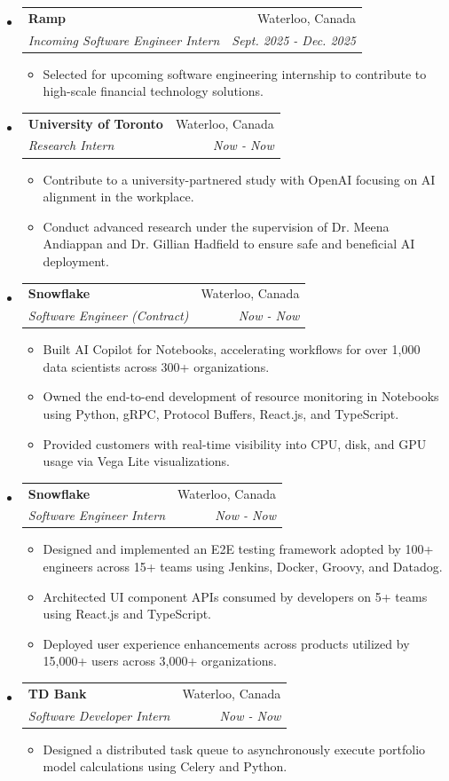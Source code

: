 \documentclass[letterpaper,11pt]{article}
\makeatletter
\newcommand{\resitem}[1]{\item #1 \vspace{-2pt}}
\newcommand{\ressubheading}[4]{
    \begin{tabular*}{6.5in}{p{4.8in}@{\extracolsep{\fill}}r}
            \textbf{#1} & #2 \\
            \textit{#3} & \textit{#4} \\
    \end{tabular*}\vspace{-8pt}}
\makeatother
\begin{document}
      \begin{itemize}
        \item \ressubheading{Ramp}{Waterloo, Canada}{Incoming Software Engineer Intern}{Sept. 2025 - Dec. 2025}
        \begin{itemize}
            \resitem{Selected for upcoming software engineering internship to contribute to high-scale financial technology solutions.}
        \end{itemize}
        \item \ressubheading{University of Toronto}{Waterloo, Canada}{Research Intern}{Now - Now}
        \begin{itemize}
            \resitem{Contribute to a university-partnered study with OpenAI focusing on AI alignment in the workplace.}
            \resitem{Conduct advanced research under the supervision of Dr. Meena Andiappan and Dr. Gillian Hadfield to ensure safe and beneficial AI deployment.}
        \end{itemize}
        \item \ressubheading{Snowflake}{Waterloo, Canada}{Software Engineer (Contract)}{Now - Now}
        \begin{itemize}
            \resitem{Built AI Copilot for Notebooks, accelerating workflows for over 1,000 data scientists across 300+ organizations.}
            \resitem{Owned the end-to-end development of resource monitoring in Notebooks using Python, gRPC, Protocol Buffers, React.js, and TypeScript.}
            \resitem{Provided customers with real-time visibility into CPU, disk, and GPU usage via Vega Lite visualizations.}
        \end{itemize}
        \item \ressubheading{Snowflake}{Waterloo, Canada}{Software Engineer Intern}{Now - Now}
        \begin{itemize}
            \resitem{Designed and implemented an E2E testing framework adopted by 100+ engineers across 15+ teams using Jenkins, Docker, Groovy, and Datadog.}
            \resitem{Architected UI component APIs consumed by developers on 5+ teams using React.js and TypeScript.}
            \resitem{Deployed user experience enhancements across products utilized by 15,000+ users across 3,000+ organizations.}
        \end{itemize}
        \item \ressubheading{TD Bank}{Waterloo, Canada}{Software Developer Intern}{Now - Now}
        \begin{itemize}
            \resitem{Designed a distributed task queue to asynchronously execute portfolio model calculations using Celery and Python.}

\end{itemize}
\end{itemize}
\end{document}

